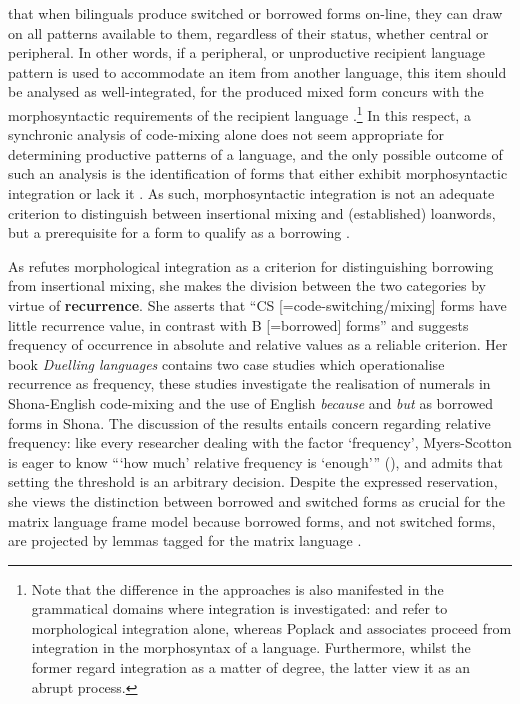 that when bilinguals produce switched or borrowed forms on-line, they can draw on all patterns available to them, regardless of their status, whether central or peripheral. In other words, if a peripheral, or unproductive recipient language pattern is used to accommodate an item from another language, this item should be analysed as well-integrated, for the produced mixed form concurs with the morphosyntactic requirements of the recipient language \citep[cf.][]{sankoff-et-al-1990}.\footnote{
Note that the difference in the approaches is also manifested in the grammatical domains where integration is investigated: \citet{myers-scotton-duelling-1993} and \citet{boumans-syntax-1998} refer to morphological integration alone, whereas Poplack and associates \citep[e.g.,][]{sankoff-et-al-1990, meechan-orphan-1995} proceed from integration in the morphosyntax of a language. Furthermore, whilst the former regard integration as a matter of degree, the latter view it as an abrupt process.}
In this respect, a synchronic analysis of code-mixing alone does not seem appropriate for determining productive patterns of a language, and the only possible outcome of such an analysis is the identification of forms that either exhibit morphosyntactic integration or lack it \citep[cf.][]{poplack-dion-2012}. As such, morphosyntactic integration is not an adequate criterion to distinguish between insertional mixing and (established) loanwords, but a prerequisite for a form to qualify as a borrowing \citep[cf.][]{poplack18}.

As \citet{myers-scotton-duelling-1993} refutes morphological integration as a criterion for distinguishing borrowing from insertional mixing, she makes the division between the two categories by virtue of \textbf{recurrence}.
She asserts that ``CS [=code-switching/mixing] forms have little recurrence value, in contrast with B [=borrowed] forms'' \citep[163]{myers-scotton-duelling-1993} and suggests frequency of occurrence in absolute and relative values as a reliable criterion. Her book \textit{Duelling languages} contains two case studies which operationalise recurrence as frequency, these studies investigate the realisation of numerals in Shona-English code-mixing and the use of English \textit{because} and \textit{but} as borrowed forms in Shona. The discussion of the results entails concern regarding relative frequency: like every researcher dealing with the factor `frequency', Myers-Scotton is eager to know ```how much' relative frequency is {`enough'}{''} (\citeyear[204]{myers-scotton-duelling-1993}), and admits that setting the threshold is an arbitrary decision. Despite the expressed reservation, she views the distinction between borrowed and switched forms  as crucial for the matrix language frame model because borrowed forms, and not switched forms, are projected by lemmas tagged for the matrix language \citep[41]{myers-scotton-contact-2002}. 

